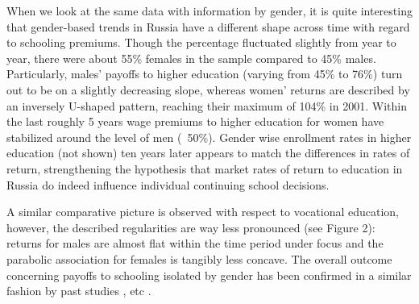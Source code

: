 \documentclass[12pt,a4paper]{article}
\numberwithin{equation}{section}
\begin{document}
When we look at the same data with information by gender, it is quite interesting that gender-based trends in Russia have a different shape across time with regard to schooling premiums. Though the percentage fluctuated slightly from year to year, there were about 55\% females in the sample compared to 45\% males. Particularly, males' payoffs to higher education (varying from 45\% to 76\%) turn out to be on a slightly decreasing slope, whereas women' returns are described by an inversely U-shaped pattern, reaching their maximum of 104\% in 2001. Within the last roughly 5 years wage premiums to higher education for women have stabilized around the level of men (~50\%).  Gender wise enrollment rates in higher education (not shown) ten years later appears to match the differences in rates of return, strengthening the hypothesis that market rates of return to education in Russia do indeed influence individual continuing school decisions. 

A similar comparative picture is observed with respect to vocational education, however, the described regularities are way less pronounced (see Figure 2): returns for males are almost flat within the time period under focus and the parabolic association for females is tangibly less concave. The overall outcome concerning payoffs to schooling isolated by gender has been confirmed in a similar fashion by past studies \parencite{cheidvasser_006._2007}, etc .
\end{document}
